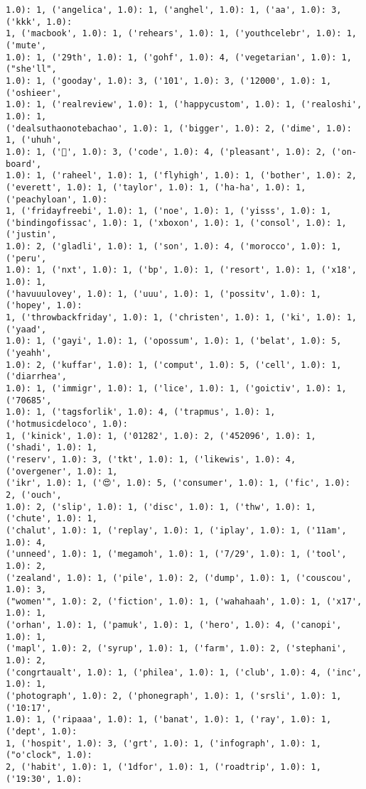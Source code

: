 \documentclass[11pt]{article}
\begin{document}
\begin{Verbatim}[commandchars=\\\{\}]
1.0): 1, ('angelica', 1.0): 1, ('anghel', 1.0): 1, ('aa', 1.0): 3, ('kkk', 1.0):
1, ('macbook', 1.0): 1, ('rehears', 1.0): 1, ('youthcelebr', 1.0): 1, ('mute',
1.0): 1, ('29th', 1.0): 1, ('gohf', 1.0): 4, ('vegetarian', 1.0): 1, ("she'll",
1.0): 1, ('gooday', 1.0): 3, ('101', 1.0): 3, ('12000', 1.0): 1, ('oshieer',
1.0): 1, ('realreview', 1.0): 1, ('happycustom', 1.0): 1, ('realoshi', 1.0): 1,
('dealsuthaonotebachao', 1.0): 1, ('bigger', 1.0): 2, ('dime', 1.0): 1, ('uhuh',
1.0): 1, ('🎵', 1.0): 3, ('code', 1.0): 4, ('pleasant', 1.0): 2, ('on-board',
1.0): 1, ('raheel', 1.0): 1, ('flyhigh', 1.0): 1, ('bother', 1.0): 2,
('everett', 1.0): 1, ('taylor', 1.0): 1, ('ha-ha', 1.0): 1, ('peachyloan', 1.0):
1, ('fridayfreebi', 1.0): 1, ('noe', 1.0): 1, ('yisss', 1.0): 1,
('bindingofissac', 1.0): 1, ('xboxon', 1.0): 1, ('consol', 1.0): 1, ('justin',
1.0): 2, ('gladli', 1.0): 1, ('son', 1.0): 4, ('morocco', 1.0): 1, ('peru',
1.0): 1, ('nxt', 1.0): 1, ('bp', 1.0): 1, ('resort', 1.0): 1, ('x18', 1.0): 1,
('havuuulovey', 1.0): 1, ('uuu', 1.0): 1, ('possitv', 1.0): 1, ('hopey', 1.0):
1, ('throwbackfriday', 1.0): 1, ('christen', 1.0): 1, ('ki', 1.0): 1, ('yaad',
1.0): 1, ('gayi', 1.0): 1, ('opossum', 1.0): 1, ('belat', 1.0): 5, ('yeahh',
1.0): 2, ('kuffar', 1.0): 1, ('comput', 1.0): 5, ('cell', 1.0): 1, ('diarrhea',
1.0): 1, ('immigr', 1.0): 1, ('lice', 1.0): 1, ('goictiv', 1.0): 1, ('70685',
1.0): 1, ('tagsforlik', 1.0): 4, ('trapmus', 1.0): 1, ('hotmusicdeloco', 1.0):
1, ('kinick', 1.0): 1, ('01282', 1.0): 2, ('452096', 1.0): 1, ('shadi', 1.0): 1,
('reserv', 1.0): 3, ('tkt', 1.0): 1, ('likewis', 1.0): 4, ('overgener', 1.0): 1,
('ikr', 1.0): 1, ('😍', 1.0): 5, ('consumer', 1.0): 1, ('fic', 1.0): 2, ('ouch',
1.0): 2, ('slip', 1.0): 1, ('disc', 1.0): 1, ('thw', 1.0): 1, ('chute', 1.0): 1,
('chalut', 1.0): 1, ('replay', 1.0): 1, ('iplay', 1.0): 1, ('11am', 1.0): 4,
('unneed', 1.0): 1, ('megamoh', 1.0): 1, ('7/29', 1.0): 1, ('tool', 1.0): 2,
('zealand', 1.0): 1, ('pile', 1.0): 2, ('dump', 1.0): 1, ('couscou', 1.0): 3,
("women'", 1.0): 2, ('fiction', 1.0): 1, ('wahahaah', 1.0): 1, ('x17', 1.0): 1,
('orhan', 1.0): 1, ('pamuk', 1.0): 1, ('hero', 1.0): 4, ('canopi', 1.0): 1,
('mapl', 1.0): 2, ('syrup', 1.0): 1, ('farm', 1.0): 2, ('stephani', 1.0): 2,
('congrtaualt', 1.0): 1, ('philea', 1.0): 1, ('club', 1.0): 4, ('inc', 1.0): 1,
('photograph', 1.0): 2, ('phonegraph', 1.0): 1, ('srsli', 1.0): 1, ('10:17',
1.0): 1, ('ripaaa', 1.0): 1, ('banat', 1.0): 1, ('ray', 1.0): 1, ('dept', 1.0):
1, ('hospit', 1.0): 3, ('grt', 1.0): 1, ('infograph', 1.0): 1, ("o'clock", 1.0):
2, ('habit', 1.0): 1, ('1dfor', 1.0): 1, ('roadtrip', 1.0): 1, ('19:30', 1.0):

\end{Verbatim}
\end{document}

